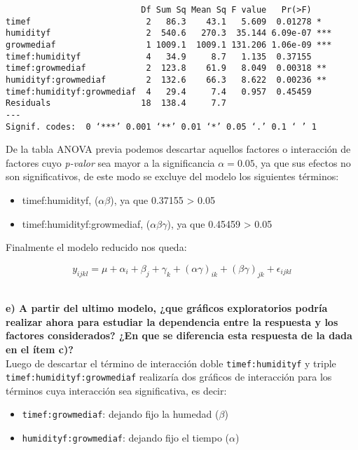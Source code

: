 \documentclass[11pt]{article}
\providecommand{\tightlist}{%
      \setlength{\itemsep}{0pt}\setlength{\parskip}{0pt}}
\begin{document}
    
    \begin{verbatim}
                           Df Sum Sq Mean Sq F value   Pr(>F)    
timef                       2   86.3    43.1   5.609  0.01278 *  
humidityf                   2  540.6   270.3  35.144 6.09e-07 ***
growmediaf                  1 1009.1  1009.1 131.206 1.06e-09 ***
timef:humidityf             4   34.9     8.7   1.135  0.37155    
timef:growmediaf            2  123.8    61.9   8.049  0.00318 ** 
humidityf:growmediaf        2  132.6    66.3   8.622  0.00236 ** 
timef:humidityf:growmediaf  4   29.4     7.4   0.957  0.45459    
Residuals                  18  138.4     7.7                     
---
Signif. codes:  0 ‘***’ 0.001 ‘**’ 0.01 ‘*’ 0.05 ‘.’ 0.1 ‘ ’ 1
    \end{verbatim}

    
    De la tabla ANOVA previa podemos descartar aquellos factores o
interacción de factores cuyo \emph{p-valor} sea mayor a la significancia
\(\alpha = 0.05\), ya que sus efectos no son significativos, de este modo se excluye del modelo los siguientes términos:

\begin{itemize}
\tightlist
\item
  timef:humidityf, (\(\alpha \beta\)), ya que 0.37155 > 0.05
\item
  timef:humidityf:growmediaf, (\(\alpha \beta \gamma\)), ya que 0.45459 > 0.05
\end{itemize}

Finalmente el modelo reducido nos queda:

\[y_{ijkl} = \mu + \alpha_i + \beta_j + \gamma_k + (\alpha \gamma)_{ik} + (\beta \gamma)_{jk} + \epsilon_{ijkl}\]\

    \textbf{e) A partir del ultimo modelo, ¿que gráficos exploratorios podría realizar ahora para estudiar la dependencia entre la respuesta y los factores considerados? ¿En que se diferencia esta respuesta de la dada en el ítem c)?}\\

Luego de descartar el término de interacción doble \texttt{timef:humidityf} y triple \texttt{timef:humidityf:growmediaf} realizaría dos gráficos de interacción para los términos cuya interacción sea significativa, es decir:

\begin{itemize}
\tightlist
\item
  \texttt{timef:growmediaf}: dejando fijo la humedad (\(\beta\))
\item
  \texttt{humidityf:growmediaf}: dejando fijo el tiempo (\(\alpha\))
\end{itemize}
\end{document}
